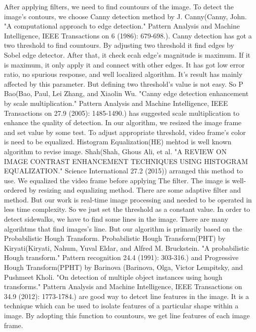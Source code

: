 After applying filters, we need to find countours of the image. To detect the image's contours, we choose Canny detection method by J. Canny(Canny, John. "A computational approach to edge detection." Pattern Analysis and Machine Intelligence, IEEE Transactions on 6 (1986): 679-698.). Canny detection has got a two threshold to find countours. By adjusting two threshold it find edges by Sobel edge detector. After that, it check ecah edge's magnitude is maximum. If it is maximum, it only apply it and connect with other edges. It has got low error ratio, no spurious response, and well localized algorithm. It's result has mainly affected by this parameter. But defining two threshold's value is not easy. So P Bao(Bao, Paul, Lei Zhang, and Xiaolin Wu. "Canny edge detection enhancement by scale multiplication." Pattern Analysis and Machine Intelligence, IEEE Transactions on 27.9 (2005): 1485-1490.) has suggested scale multiplication to enhance the quality of detection. In our algorithm, we resized the image frame and set value by some test.\newline
To adjust appropriate threshold, video frame's color is need to be equalized. Histogram Equalization(HE) mehtod is well known algorithm to revise image. Shah(Shah, Ghous Ali, et al. "A REVIEW ON IMAGE CONTRAST ENHANCEMENT TECHNIQUES USING HISTOGRAM EQUALIZATION." Science International 27.2 (2015)) arranged this method to use. We equalized the video frame before applying The filter. The image is well-ordered by resizing and equalizing method. There are some adaptive filter and method. But our work is real-time image processing and needed to be operated in less time complexity. So we just set the threshold as a constant value. \newline
In order to detect sidewalks, we have to find some lines in the image. There are many algorihtms that find images's line. But our algorithm is primarily based on the Probabilistic Hough Transform. Probabilistic Hough Transform(PHT) by Kiryati(Kiryati, Nahum, Yuval Eldar, and Alfred M. Bruckstein. "A probabilistic Hough transform." Pattern recognition 24.4 (1991): 303-316.) and Progressive Hough Transform(PPHT) by Barinova (Barinova, Olga, Victor Lempitsky, and Pushmeet Kholi. "On detection of multiple object instances using hough transforms." Pattern Analysis and Machine Intelligence, IEEE Transactions on 34.9 (2012): 1773-1784.) are good way to detcet line features in the image. It is a technique which can be used to isolate features of a particular shape within a image. By adopting this function to countours, we get line features of each image frame. 
